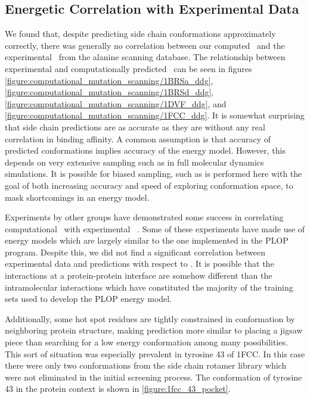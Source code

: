 \subsection{Energetic Correlation with Experimental Data}
\label{subsection:energetic_correlation_with_experimental_data}
We found that, despite predicting side chain conformations approximately correctly, there was generally no correlation between our computed \ddg\ and the experimental \ddg\ from the alanine scanning database.
The relationship between experimental and computationally predicted \ddg\ can be seen in figures \ref{figure:computational_mutation_scanning/1BRSa_ddg}, \ref{figure:computational_mutation_scanning/1BRSd_ddg}, \ref{figure:computational_mutation_scanning/1DVF_ddg}, and \ref{figure:computational_mutation_scanning/1FCC_ddg}.
It is somewhat surprising that side chain predictions are as accurate as they are without any real correlation in binding affinity.
A common assumption is that accuracy of predicted conformations implies accuracy of the energy model.
However, this depends on very extensive sampling such as in full molecular dynamics simulations.
It is possible for biased sampling, such as is performed here with the goal of both increasing accuracy and speed of exploring conformation space, to mask shortcomings in an energy model.

Experiments by other groups have demonstrated some success in correlating computational \ddg\ with experimental \ddg\ \cite{kortemme2004computational}.
Some of these experiments have made use of energy models which are largely similar to the one implemented in the PLOP program.
Despite this, we did not find a significant correlation between experimental data and predictions with respect to \ddg.
It is possible that the interactions at a protein-protein interface are somehow different than the intramolecular interactions which have constituted the majority of the training sets used to develop the PLOP energy model.

Additionally, some hot spot residues are tightly constrained in conformation by neighboring protein structure, making prediction more similar to placing a jigsaw piece than searching for a low energy conformation among many possibilities.
This sort of situation was especially prevalent in tyrosine 43 of 1FCC.
In this case there were only two conformations from the side chain rotamer library which were not eliminated in the initial screening process.
The conformation of tyrosine 43 in the protein context is shown in \ref{figure:1fcc_43_pocket}.

